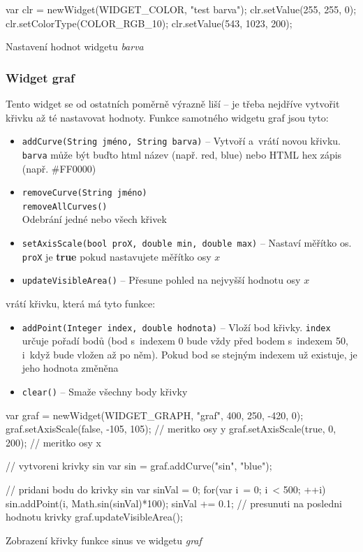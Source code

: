 \documentclass[12pt, a4paper, oneside]{article}
\newcommand{\It}{\textit}  %
\begin{document}
\begin{listing}[H]
\begin{jscode}
var clr = newWidget(WIDGET_COLOR, "test barva");
clr.setValue(255, 255, 0);
clr.setColorType(COLOR_RGB_10);
clr.setValue(543, 1023, 200);
\end{jscode}
\caption{Nastavení hodnot widgetu \It{barva}}
\end{listing}

\subsubsection*{Widget graf}
Tento widget se od ostatních poměrně výrazně liší -- je třeba nejdříve vytvořit křivku až té nastavovat hodnoty. Funkce samotného widgetu graf jsou tyto:
\begin{itemize}
    \item {\color{blue}\verb/addCurve(String jméno, String barva)/} -- Vytvoří a~vrátí novou křivku. \verb/barva/ může být buďto html název (např. red, blue) nebo HTML hex zápis (např. \#FF0000)
    \item {\color{blue}\verb/removeCurve(String jméno)/} \\
        {\color{blue}\verb/removeAllCurves()/} \\
        Odebrání jedné nebo všech křivek
    \item {\color{blue}\verb/setAxisScale(bool proX, double min, double max)/} -- Nastaví měřítko os. \verb/proX/ je {\bf true} pokud nastavujete měřítko osy $x$
    \item {\color{blue}\verb/updateVisibleArea()/} -- Přesune pohled na nejvyšší hodnotu osy $x$
\end{itemize}

 vrátí křivku, která má tyto funkce:

\begin{itemize}
    \item {\color{blue}\verb/addPoint(Integer index, double hodnota)/} -- Vloží bod křivky. \verb/index/ určuje pořadí bodů (bod s~indexem 0 bude vždy před bodem s~indexem 50, i~když bude vložen až po něm). Pokud bod se stejným indexem už existuje, je jeho hodnota změněna
    \item {\color{blue}\verb/clear()/} -- Smaže všechny body křivky
\end{itemize}

\begin{listing}[H]
\begin{jscode}
var graf = newWidget(WIDGET_GRAPH, "graf", 400, 250, -420, 0);
graf.setAxisScale(false, -105, 105); // meritko osy y
graf.setAxisScale(true, 0, 200); // meritko osy x

// vytvoreni krivky sin
var sin = graf.addCurve("sin", "blue"); 

// pridani bodu do krivky sin
var sinVal = 0;
for(var i~= 0; i~< 500; ++i) {
    sin.addPoint(i, Math.sin(sinVal)*100);
    sinVal += 0.1;
}
// presunuti na posledni hodnotu krivky
graf.updateVisibleArea(); 
\end{jscode}
\caption{Zobrazení křivky funkce sinus ve widgetu \It{graf}}
\end{listing}
\end{document}
